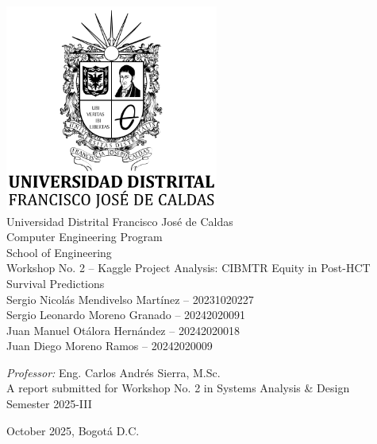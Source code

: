 \documentclass[a4paper,11pt,oneside]{book}
\begin{document}
    
    \frontmatter
    
    \begin{titlepage}      
        \begin{center}
            \includegraphics[width=7cm]{figures/UDLogo.png}\\[0.3cm]
            {\LARGE Universidad Distrital Francisco José de Caldas\\[0.3cm]
            Computer Engineering Program\\[0.3cm]
            School of Engineering}\\[2cm]
			
            \linespread{1.0}\huge {
                Workshop No. 2 -- Kaggle Project Analysis: CIBMTR Equity in Post-HCT Survival Predictions
            }
            \linespread{1}~\\[2cm]
            {\Large 
                Sergio Nicolás Mendivelso Martínez -- 20231020227\\
                Sergio Leonardo Moreno Granado -- 20242020091\\
                Juan Manuel Otálora Hernández -- 20242020018\\
                Juan Diego Moreno Ramos -- 20242020009\\
            }
            

            {\Large 
                \emph{Professor:} Eng. Carlos Andrés Sierra, M.Sc.}\\[1cm]
            
    		\large A report submitted for Workshop No. 2 in Systems Analysis \& Design\\
            Semester 2025-III 
            \\[0.3cm] 
            \vfill
            
            
            October 2025, Bogotá D.C.
        \end{center}
    \end{titlepage}
\end{document}
